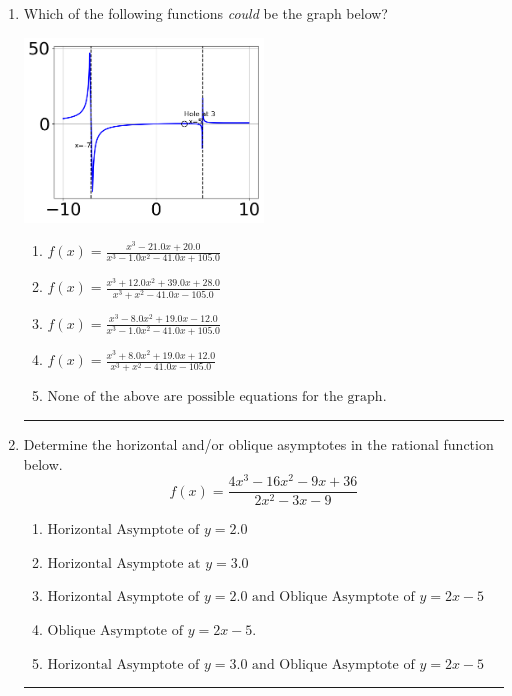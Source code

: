 \documentclass[14pt]{extbook}
\newcommand{\litem}[1]{\item#1\hspace*{-1cm}\rule{\textwidth}{0.4pt}}
\begin{document}
\begin{enumerate}
{\begin{enumerate}[label=\Alph*.]
\end{enumerate} }
\litem{
Which of the following functions \textit{could} be the graph below?
\begin{center}
    \includegraphics[width=0.5\textwidth]{../Figures/identifyGraphOfRationalFunctionCopyC.png}
\end{center}
\begin{enumerate}[label=\Alph*.]
\item \( f(x)=\frac{x^{3} -21.0 x + 20.0}{x^{3} -1.0 x^{2} -41.0 x + 105.0} \)
\item \( f(x)=\frac{x^{3} +12.0 x^{2} +39.0 x + 28.0}{x^{3} + x^{2} -41.0 x -105.0} \)
\item \( f(x)=\frac{x^{3} -8.0 x^{2} +19.0 x -12.0}{x^{3} -1.0 x^{2} -41.0 x + 105.0} \)
\item \( f(x)=\frac{x^{3} +8.0 x^{2} +19.0 x + 12.0}{x^{3} + x^{2} -41.0 x -105.0} \)
\item \( \text{None of the above are possible equations for the graph.} \)

\end{enumerate} }
\litem{
Determine the horizontal and/or oblique asymptotes in the rational function below.\[ f(x) = \frac{4x^{3} -16 x^{2} -9 x + 36}{2x^{2} -3 x -9} \]\begin{enumerate}[label=\Alph*.]
\item \( \text{Horizontal Asymptote of } y = 2.0  \)
\item \( \text{Horizontal Asymptote at } y = 3.0 \)
\item \( \text{Horizontal Asymptote of } y = 2.0 \text{ and Oblique Asymptote of } y = 2x -5 \)
\item \( \text{Oblique Asymptote of } y = 2x -5. \)
\item \( \text{Horizontal Asymptote of } y = 3.0 \text{ and Oblique Asymptote of } y = 2x -5 \)


\end{enumerate}}
\end{enumerate}
\end{document}
